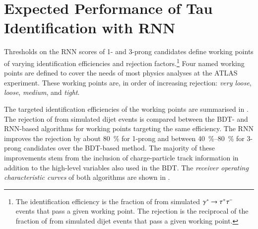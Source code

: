 \section{Expected Performance of Tau Identification with RNN}%
\label{sec:tauid_perf}

Thresholds on the RNN scores of 1- and 3-prong \tauhadvis candidates define
working points of varying \tauhadvis identification efficiencies and
\faketauhadvis rejection factors.\footnote{The \tauhadvis identification
  efficiency is the fraction of \truetauhadvis from simulated
  $\gammastar \to \tautau$ events that pass a given working point. The
  \faketauhadvis rejection is the reciprocal of the fraction of \faketauhadvis
  from simulated dijet events that pass a given working point.} Four named
working points are defined to cover the needs of most physics analyses at the
ATLAS experiment. These working points are, in order of increasing
\faketauhadvis rejection: \emph{very loose}, \emph{loose}, \emph{medium}, and
\emph{tight}.

The targeted \tauhadvis identification efficiencies of the working points are
summarised in . The rejection of \faketauhadvis from simulated
dijet events is compared between the BDT- and RNN-based \tauid algorithms for
working points targeting the same \tauhadvis efficiency. The RNN \tauid improves
the \faketauhadvis rejection by about \SI{80}{\percent} for 1-prong and between
\SIrange{40}{80}{\percent} for 3-prong \tauhadvis candidates over the BDT-based
method. The majority of these improvements stem from the inclusion of
charge-particle track information in addition to the high-level variables also
used in the BDT. The \emph{receiver operating characteristic curves} of both
algorithms are shown in .

\begin{table}[htbp]
  \centering

  \caption[Comparison of working points defined for the BDT- and RNN-based
  \tauid]{Comparison of working points defined for the BDT- and RNN-based
    \tauid. Only the targeted \tauhadvis efficiency (target \tauhadvis eff.) of
    the working points is given, which can deviate by ca.\ \SI{1}{\percent} from
    the efficiency observed in simulated $\gammastar \to \tautau$ events. The
    \faketauhadvis rejection is evaluated using the \tauhadvis candidate sample
    from dijet events.}%
  \label{tab:rnn_wps}

  
\end{table}

